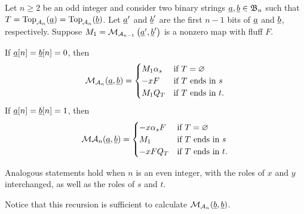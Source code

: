\begin{proposition}
	Let $n \ge 2$ be an odd integer and consider two binary strings $\underline{a}, \underline{b} \in \mathfrak B_n$ such that $T = \operatorname{Top}_{\mathcal A_n}(\underline{a}) = \operatorname{Top}_{\mathcal A_n}(\underline{b})$.  
	Let $\underline{a}'$ and $\underline{b}'$ are the first $n-1$ bits of $\underline{a}$ and $\underline{b}$, respectively. 
	Suppose $M_1 = \mathcal M_{\mathcal A_{n-1}} \left(\underline{a}', \underline{b}'\right)$ is a nonzero map with fluff $F$.
	\begin{enumerate}[(i)]
		\ii If $\underline{a}[n] = \underline{b}[n] = 0$, then
		\[ \MM_{\AA_n} (\ul a, \ul b)
			=
			\begin{cases}
				M_1 \alpha_s & \text{if $T = \varnothing$} \\ %
				-xF & \text{if $T$ ends in $s$} \\ %
				M_1 Q_T & \text{if $T$ ends in $t$}. \\ %
			\end{cases}
		\]
		\ii If $\underline{a}[n] = \underline{b}[n] = 1$, then
		\[
			\MM \AA_n (\ul a, \ul b)
			=
			\begin{cases}
				-x\alpha_sF & \text{if $T = \varnothing$} \\ %
				M_1 & \text{if $T$ ends in $s$} \\ %
				-xF Q_T & \text{if $T$ ends in $t$}. %
			\end{cases}
		\]
	\end{enumerate}
	Analogous statements hold when $n$ is an even integer, with the roles of $x$ and $y$ interchanged, as well as the roles of $s$ and $t$.
	\label{thm:recurse}
\end{proposition}

Notice that this recursion is sufficient to calculate $\mathcal M_{\mathcal A_n}(\underline{b}, \underline{b})$.

